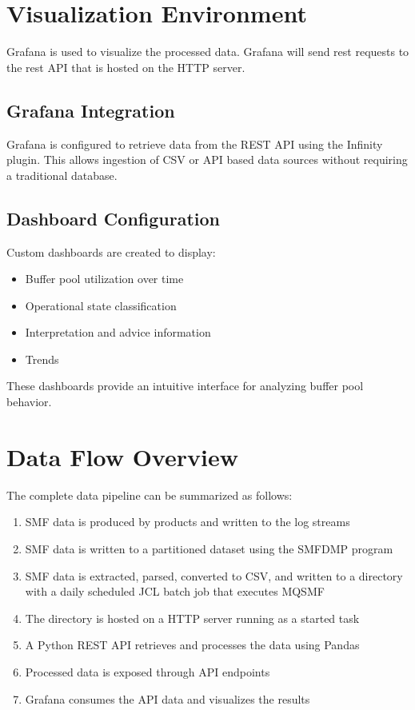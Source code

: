 \section{Visualization Environment}

Grafana is used to visualize the processed data. Grafana will send rest requests to the rest API that is hosted on the HTTP server.  

\subsection{Grafana Integration}

Grafana is configured to retrieve data from the REST API using the Infinity plugin. This allows ingestion of CSV or API based data sources without requiring a traditional database.

\subsection{Dashboard Configuration}

Custom dashboards are created to display:

\begin{itemize}
    \item Buffer pool utilization over time
    \item Operational state classification
    \item Interpretation and advice information
    \item Trends 
\end{itemize}

These dashboards provide an intuitive interface for analyzing buffer pool behavior. 

\section{Data Flow Overview}

The complete data pipeline can be summarized as follows:

\begin{enumerate}
    \item SMF data is produced by products and written to the log streams
    \item SMF data is written to a partitioned dataset using the SMFDMP program
    \item SMF data is extracted, parsed, converted to CSV, and written to a directory with a daily scheduled JCL batch job that executes MQSMF
    \item The directory is hosted on a HTTP server running as a started task
    \item A Python REST API retrieves and processes the data using Pandas
    \item Processed data is exposed through API endpoints
    \item Grafana consumes the API data and visualizes the results
\end{enumerate}

